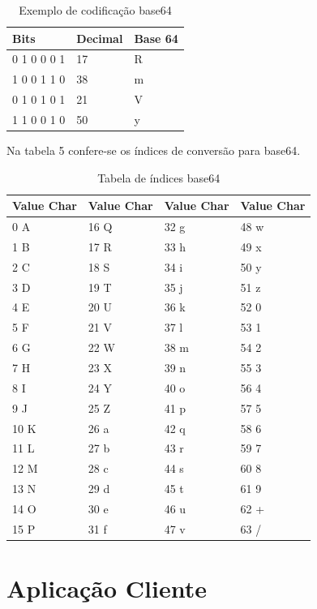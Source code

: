 \documentclass[12pt]{article}
\begin{document}
\begin{table}[ht]
	\centering
	\caption{Exemplo de codificação base64}
	\label{tab:Table4}
	\smallskip
	\begin{tabular}{ |l|l|l| }
		\hline
		Bits & Decimal & Base 64\\ \hline
		0 1 0 0 0 1 & 17 & R \\ \hline
		1 0 0 1 1 0 & 38 & m \\ \hline
		0 1 0 1 0 1 & 21 & V \\ \hline
		1 1 0 0 1 0 & 50 & y \\ \hline
	\end{tabular}
\end{table}

Na tabela 5 confere-se os índices de conversão para base64.

\begin{table}[ht]
	\centering
	\caption{Tabela de índices base64}
	\label{tab:Table5}
	\smallskip
	\begin{tabular}{ |l|l|l|l| }
		\hline
		Value Char&Value Char&Value Char&Value Char \\ \hline
		0	A&	16	Q&	32	g&	48	w \\ \hline
		1	B&	17	R&	33	h&	49	x \\ \hline
		2	C&	18	S&	34	i&	50	y \\ \hline
		3	D&	19	T&	35	j&	51	z \\ \hline
		4	E&	20	U&	36	k&	52	0 \\ \hline
		5	F&	21	V&	37	l&	53	1 \\ \hline
		6	G&	22	W&	38	m&	54	2 \\ \hline
		7	H&	23	X&	39	n&	55	3 \\ \hline
		8	I&	24	Y&	40	o&	56	4 \\ \hline
		9	J&	25	Z&	41	p&	57	5 \\ \hline
		10	K&	26	a&	42	q&	58	6 \\ \hline
		11	L&	27	b&	43	r&	59	7 \\ \hline
		12	M&	28	c&	44	s&	60	8 \\ \hline
		13	N&	29	d&	45	t&	61	9 \\ \hline
		14	O&	30	e&	46	u&	62	+ \\ \hline
		15	P&	31	f&	47	v&	63	/ \\ \hline
	\end{tabular}
\end{table}

\section{Aplicação Cliente}
\end{document}
